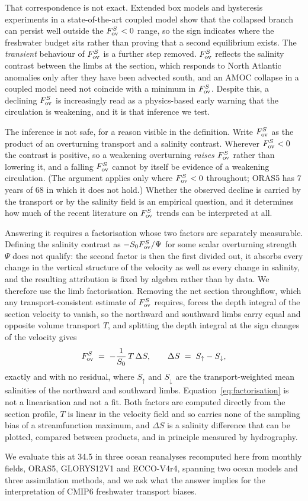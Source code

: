 That correspondence is not exact. Extended box models\cite{Cimatoribus2014}
and hysteresis experiments in a state-of-the-art coupled
model\cite{vanWestenDijkstra2023} show that the collapsed branch can persist
well outside the $F_{\mathrm{ov}}^{S}<0$ range, so the sign indicates where the freshwater
budget sits rather than proving that a second equilibrium exists. The
\emph{transient} behaviour of $F_{\mathrm{ov}}^{S}$ is a further step removed. $F_{\mathrm{ov}}^{S}$
reflects the salinity contrast between the limbs at the section, which responds
to North Atlantic anomalies only after they have been advected south, and an
AMOC collapse in a coupled model need not coincide with a minimum in
$F_{\mathrm{ov}}^{S}$\cite{vanWesten2025,Vanderborght2025}. Despite this, a declining $F_{\mathrm{ov}}^{S}$
is increasingly read as a physics-based early warning that the circulation is
weakening\cite{vanWesten2024,Zhu2020,Zhu2023}, and it is that inference we test.

The inference is not safe, for a reason visible in the definition. Write
$F_{\mathrm{ov}}^{S}$ as the product of an overturning transport and a salinity contrast.
Wherever $F_{\mathrm{ov}}^{S}<0$ the contrast is positive, so a weakening overturning
\emph{raises} $F_{\mathrm{ov}}^{S}$ rather than lowering it, and a falling $F_{\mathrm{ov}}^{S}$ cannot by
itself be evidence of a weakening circulation\cite{Vanderborght2025}. (The
argument applies only where $F_{\mathrm{ov}}^{S}<0$ throughout; ORAS5 has 7 years of 68 in
which it does not hold.) Whether the observed decline is carried by the
transport or by the salinity field is an empirical question, and it determines
how much of the recent literature on $F_{\mathrm{ov}}^{S}$ trends can be interpreted at all.

Answering it requires a factorisation whose two factors are separately
measurable. Defining the salinity contrast as $-S_0F_{\mathrm{ov}}^{S}/\Psi$ for some scalar
overturning strength $\Psi$ does not qualify: the second factor is then the
first divided out, it absorbs every change in the vertical structure of the
velocity as well as every change in salinity, and the resulting attribution is
fixed by algebra rather than by data. We therefore use the limb factorisation.
Removing the net section throughflow, which any transport-consistent estimate
of $F_{\mathrm{ov}}^{S}$ requires, forces the depth integral of the section velocity to
vanish, so the northward and southward limbs carry equal and opposite volume
transport $T$, and splitting the depth integral at the sign changes of the
velocity gives
\begin{equation}
F_{\mathrm{ov}}^{S} \;=\; -\frac{1}{S_0}\,T\,\Delta S,
\qquad \Delta S \;=\; S_{\uparrow}-S_{\downarrow},
\label{eq:factorisation}
\end{equation}
exactly and with no residual, where $S_{\uparrow}$ and $S_{\downarrow}$ are the
transport-weighted mean salinities of the northward and southward limbs.
Equation~\eqref{eq:factorisation} is not a linearisation and not a fit. Both
factors are computed directly from the section profile, $T$ is linear in the
velocity field and so carries none of the sampling bias of a streamfunction
maximum, and $\Delta S$ is a salinity difference that can be plotted, compared
between products, and in principle measured by hydrography.

We evaluate this at 34.5\degS{} in three ocean reanalyses recomputed here from
monthly fields, ORAS5, GLORYS12V1 and ECCO-V4r4, spanning two ocean models and
three assimilation methods, and we ask what the answer implies for the
interpretation of CMIP6 freshwater transport biases.

